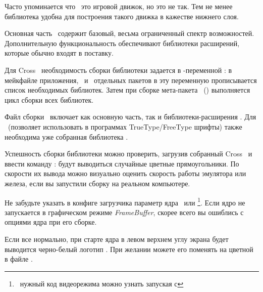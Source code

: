 {Часто упоминается что \sdl\ это игровой движок, но это не так. Тем не менее
библиотека удобна для построения такого движка в кажестве нижнего слоя.

Основная часть \sdl\ содержит базовый, весьма ограниченный спектр возможностей.
Дополнительную функциональность обеспечивают библиотеки расширений, которые
обычно входят в поставку.


Для Cross \linux\ необходимость сборки библиотеки задается в
\make-пе\-ре\-мен\-ной : в мейкфайле приложения, \ и
\ отдельных пакетов в эту переменную прописывается список необходимых
библиотек. Затем при сборке мета-пакета \ ()
выполняется цикл сборки всех библиотек.

Файл сборки \sdl\ включает как основную часть, так и библиотеки-рас\-ши\-ре\-ния
. Для \ (позволяет использовать в программах
True\-Type/Free\-Type шрифты) также необходима уже собранная библиотека
.




Успешность сборки библиотеки можно проверить, загрузив собранный Cross
\linux\ и ввести команду : будут выводиться случайные цветные
прямоугольники. По скорости их вывода можно визуально оценить скорость работы
эмулятора или железа, если вы запустили сборку на реальном компьютере.

Не забудьте указать в конфиге загрузчика параметр ядра \ или
\footnote{\ нужный код видеорежима можно узнать запуская с
}. Если ядро не запускается в графическом режиме
\emph{FrameBuffer}, скорее всего вы ошиблись с опциями ядра при его сборке.

Если все нормально, при старте ядра в левом верхнем углу экрана будет выводится
черно-белый логотип \linux. При желании можете его поменять на цветной в файле
\href{https://github.com/ponyatov/cross/raw/master/config/arch/i386/VGA.kernel}{}.


}
